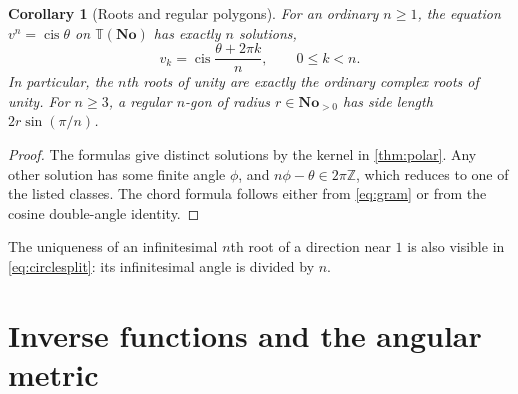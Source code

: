 \documentclass[11pt]{article}
\numberwithin{equation}{section}
\newtheorem{corollary}[theorem]{Corollary}
\theoremstyle{definition}
\newcommand{\No}{\mathbf{No}}
\newcommand{\Z}{\mathbb Z}
\newcommand{\TT}{\mathbb T}
\newcommand{\cis}{\operatorname{cis}}
\begin{document}
\begin{corollary}[Roots and regular polygons]\label{cor:rootsunity}
For an ordinary $n\ge1$, the equation $v^n=\cis\theta$ on $\TT(\No)$ has exactly $n$ solutions,
\[
 v_k=\cis\frac{\theta+2\pi k}{n},\qquad 0\le k<n.
\]
In particular, the $n$th roots of unity are exactly the ordinary complex roots of unity. For $n\ge3$, a regular $n$-gon of radius $r\in\No_{>0}$ has side length $2r\sin(\pi/n)$.
\end{corollary}
\begin{proof}
The formulas give distinct solutions by the kernel in \cref{thm:polar}. Any other solution has some finite angle $\phi$, and $n\phi-\theta\in2\pi\Z$, which reduces to one of the listed classes. The chord formula follows either from \eqref{eq:gram} or from the cosine double-angle identity.
\end{proof}
The uniqueness of an infinitesimal $n$th root of a direction near $1$ is also visible in \eqref{eq:circlesplit}: its infinitesimal angle is divided by $n$.

\section{Inverse functions and the angular metric}\label{sec:inverse}
\end{document}
